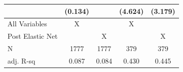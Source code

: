 {\begin{tabular}{l*{4}{c}}
                    &     (0.134)        &                    &     (4.624)        &     (3.179)        \\
\midrule
All Variables       &           X        &                    &           X        &                    \\
Post Elastic Net    &                    &           X        &                    &           X        \\
N                   &        1777        &        1777        &         379        &         379        \\
adj. R-sq           &       0.087        &       0.084        &       0.430        &       0.445        \\
\bottomrule
\end{tabular}
}
